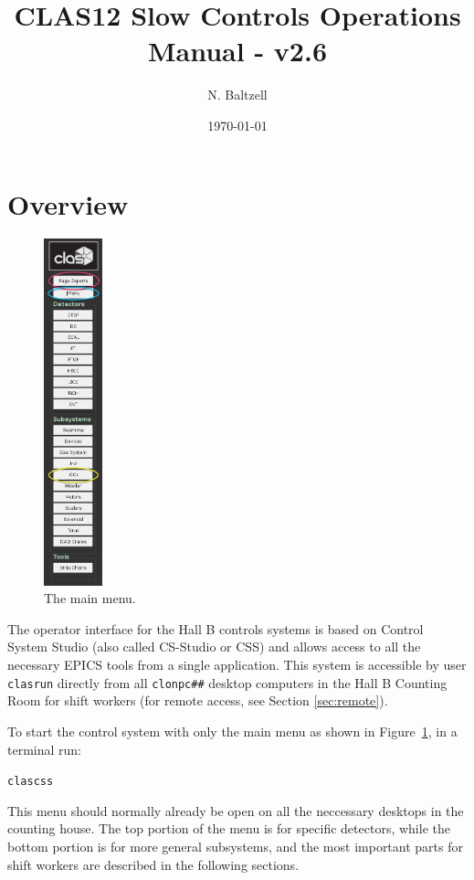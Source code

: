 \documentclass[amsmath,amssymb,notitlepage,11pt]{revtex4}
\begin{document}
\title{CLAS12 Slow Controls Operations Manual - v2.6}
\author{N. Baltzell}
\date{\today}
\begin{abstract}
\end{abstract}

\maketitle
\tableofcontents
\newpage

\section{Overview}

\begin{figure}\centering\vspace{1cm}
  \includegraphics[width=0.15\textwidth]{pics/mainmenu}
  \caption{The main menu.\label{fig:mainmenu}}
\end{figure}

The operator interface for the Hall B controls systems is based on Control System Studio (also called CS-Studio or CSS) and allows access to all the necessary EPICS tools from a single application.  This system is accessible by user \texttt{clasrun} directly from all \texttt{clonpc\#\#} desktop computers in the Hall B Counting Room for shift workers (for remote access, see Section \ref{sec:remote}).


To start the control system with only the main menu as shown in Figure~\ref{fig:mainmenu}, in a terminal run: \begin{center}\texttt{clascss}\end{center}  This menu should normally already be open on all the neccessary desktops in the counting house.  The top portion of the menu is for specific detectors, while the bottom portion is for more general subsystems, and the most important parts for shift workers are described in the following sections.
\end{document}

